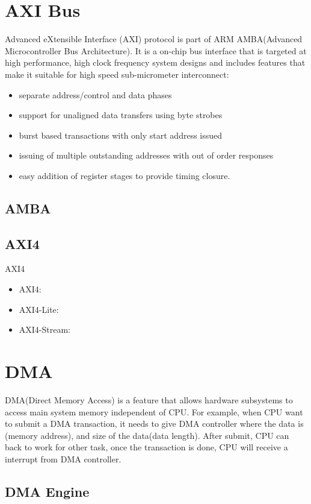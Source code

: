 \section{AXI Bus}
\label{sec:AXI Bus}

Advanced eXtensible Interface (AXI) protocol is part of ARM AMBA(Advanced Microcontroller Bus Architecture).
It is a on-chip bus interface that is targeted at high performance, high clock frequency system designs and includes features that make it suitable for high speed sub-micrometer interconnect:
\begin{itemize}
\item separate address/control and data phases
\item support for unaligned data transfers using byte strobes
\item burst based transactions with only start address issued
\item issuing of multiple outstanding addresses with out of order responses
\item easy addition of register stages to provide timing closure.
\end{itemize}

\subsection{AMBA}
\label{subsec:AMBA}

 
\subsection{AXI4}
\label{subsec:AXI4}
AXI4
\begin{itemize}
\item AXI4:
\item AXI4-Lite:
\item AXI4-Stream:
\end{itemize}





\section{DMA}
\label{sec:DMA}

DMA(Direct Memory Access) is a feature that allows hardware subsystems to access main system memory independent of CPU. For example, when CPU want to submit a DMA transaction, it needs to give DMA controller where the data is (memory address), and size of the data(data length). After submit, CPU can back to work for other task, once the transaction is done, CPU will receive a interrupt from DMA controller.
 

\subsection{DMA Engine }
\label{subsec:DMA Engine}